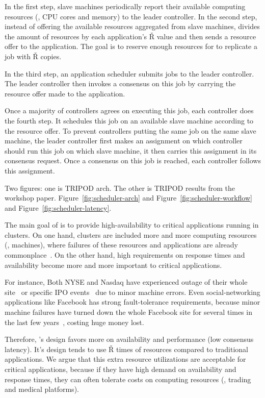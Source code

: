 In the first step, slave machines periodically report their available computing 
resources (\eg, CPU cores and memory) to the leader controller. In the second 
step, instead of offering the available resources aggregated from slave 
machines, \tripod divides the amount of resources by each application's \v{R} 
value and then sends a resource offer to the application. The goal is to 
reserve enough resources for \tripod to replicate a job with \v{R} copies.

In the third step, an application scheduler submits jobs to the leader 
controller. The leader controller then invokes a consensus on this job by 
carrying the resource offer made to the application.

Once a majority of controllers agrees on executing this job, each controller 
does the fourth step. It schedules this job on an available slave machine 
according to the resource offer. To prevent controllers putting the same job on 
the same slave machine, the leader controller first makes an assignment on 
which controller should run this job on which slave machine, it then carries 
this assignment in its consensus request. Once a consensus on this job is 
reached, each controller follows this assignment.

Two figures: one is TRIPOD arch. The other is TRIPOD results from the workshop 
paper. Figure~\ref{fig:scheduler-arch} and Figure~\ref{fig:scheduler-workflow} 
and Figure~\ref{fig:scheduler-latency}.


 The main goal of \xxx is to 
provide high-availability to critical applications 
running in clusters. On one hand, clusters are included more and more computing 
resources (\eg, machines), where failures of these resources and applications 
are already commonplace~\cite{facebook:outage}. On the other hand, 
high requirements on response times and availability become more and more 
important to critical applications.

For instance, Both NYSE and Nasdaq have experienced outage of their whole 
site~\cite{nyse:halt} or specific IPO events~\cite{facebook:ipo:delay} due to 
minor machine errors.  Even social-networking applications like Facebook has 
strong fault-tolerance requirements, because minor machine failures have turned 
down the whole Facebook site for several times in the last few 
years~\cite{facebook:outage}, costing huge 
money lost. 

Therefore, \tripod's design favors more on availability and performance 
(low consensus latency). It's design tends to use \v{R} times of resources 
compared to traditional applications. We argue that this extra resource 
utilizations are acceptable for critical applications, because if they have 
high 
demand on availability and response times, they can often tolerate costs on 
computing resources (\eg, trading and medical platforms).

